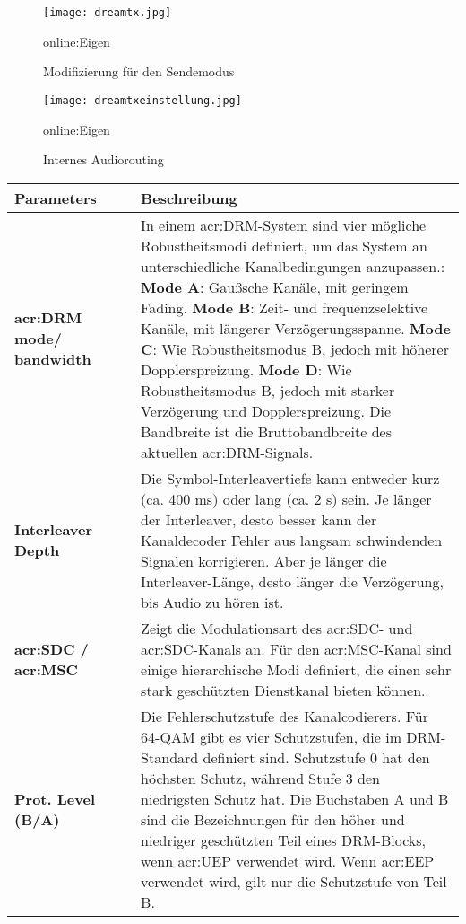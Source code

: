 \begin{figure}[H]
	\centering
	\texttt{[image: dreamtx.jpg]}
	\caption[Modifizierung für den Sendemodus]{Modifizierung für den Sendemodus} \gls{online:Eigen}
	\label{fig:dreamtx}
\end{figure}

\begin{figure}[H]
	\centering
	\texttt{[image: dreamtxeinstellung.jpg]}
	\caption[Internes Audiorouting]{Internes Audiorouting} \gls{online:Eigen}
	\label{fig:dreamtxeinstellung}
\end{figure}

\begin{table}[h]
	\begin{center}
		\begin{tabular}{|p{0.28\linewidth} | p{0.72\linewidth}|}	
			\toprule
			\textbf{Parameters} &\textbf{Beschreibung}\\
			\midrule
			\textbf{\gls{acr:DRM} mode/ bandwidth} & In einem \gls{acr:DRM}-System sind vier mögliche Robustheitsmodi definiert, um das System an unterschiedliche Kanalbedingungen anzupassen.:\newline
			\textbf{Mode A}: Gaußsche Kanäle, mit geringem Fading.\newline
			\textbf{Mode B}: Zeit- und frequenzselektive Kanäle, mit längerer Verzögerungsspanne.\newline
			\textbf{Mode C}: Wie Robustheitsmodus B, jedoch mit höherer Dopplerspreizung.\newline
			\textbf{Mode D}: Wie Robustheitsmodus B, jedoch mit starker Verzögerung und Dopplerspreizung.\newline
			Die Bandbreite ist die Bruttobandbreite des aktuellen \gls{acr:DRM}-Signals. \\
			\midrule
			\textbf{Interleaver Depth} & Die Symbol-Interleavertiefe kann entweder kurz (ca. 400 ms) oder lang (ca. 2 s) sein. Je länger der Interleaver, desto besser kann der Kanaldecoder Fehler aus langsam schwindenden Signalen korrigieren. Aber je länger die Interleaver-Länge, desto länger die Verzögerung, bis Audio zu hören ist.\\
			\midrule			
			\textbf{\gls{acr:SDC} / \gls{acr:MSC}} & Zeigt die Modulationsart des \gls{acr:SDC}- und \gls{acr:SDC}-Kanals an. Für den \gls{acr:MSC}-Kanal sind einige hierarchische Modi definiert, die einen sehr stark geschützten Dienstkanal bieten können.\\
			\midrule
			\textbf{Prot. Level (B/A)} & Die Fehlerschutzstufe des Kanalcodierers. Für 64-QAM gibt es vier Schutzstufen, die im DRM-Standard definiert sind. Schutzstufe 0 hat den höchsten Schutz, während Stufe 3 den niedrigsten Schutz hat. Die Buchstaben A und B sind die Bezeichnungen für den höher und niedriger geschützten Teil eines DRM-Blocks, wenn \gls{acr:UEP} verwendet wird. Wenn \gls{acr:EEP} verwendet wird, gilt nur die Schutzstufe von Teil B.\\

\end{tabular}
\end{center}
\end{table}
